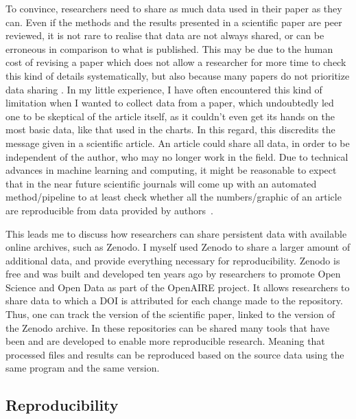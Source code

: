To convince, researchers need to share as much data used in their paper as they can. Even if the methods and the results presented in a scientific paper are peer reviewed, it is not rare to realise that data are not always shared, or can be erroneous in comparison to what is published. This may be due to the human cost of revising a paper which does not allow a researcher for more time to check this kind of details systematically, but also because many papers do not prioritize data sharing \citep{dance_stop_2023}. In my little experience, I have often encountered this kind of limitation when I wanted to collect data from a paper, which undoubtedly led one to be skeptical of the article itself, as it couldn't even get its hands on the most basic data, like that used in the charts. In this regard, this discredits the message given in a scientific article. An article could share all data, in order to be independent of the author, who may no longer work in the field. Due to technical advances in machine learning and computing, it might be reasonable to expect that in the near future scientific journals will come up with an automated method/pipeline to at least check whether all the numbers/graphic of an article are reproducible from data provided by authors~\citep{schulz_is_2022}.

This leads me to discuss how researchers can share persistent data with available online archives, such as Zenodo. I myself used Zenodo to share a larger amount of additional data, and provide everything necessary for reproducibility. Zenodo is free and was built and developed ten years ago by researchers to promote Open Science and Open Data as part of the OpenAIRE project. It allows researchers to share data to which a DOI is attributed for each change made to the repository. Thus, one can track the version of the scientific paper, linked to the version of the Zenodo archive. In these repositories can be shared many tools that have been and are developed to enable more reproducible research. Meaning that processed files and results can be reproduced based on the source data using the same program and the same version. 


\subsection{Reproducibility}

